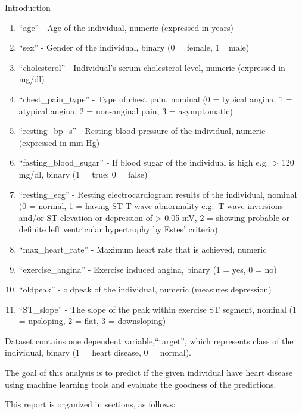 \documentclass[
  ignorenonframetext,
]{beamer}
\begin{document}
\begin{frame}{Introduction}
\begin{enumerate}
\item
  ``age'' - Age of the individual, numeric (expressed in years)
\item
  ``sex'' - Gender of the individual, binary (0 = female, 1= male)
\item
  ``cholesterol'' - Individual's serum cholesterol level, numeric
  (expressed in mg/dl)
\item
  ``chest\_pain\_type'' - Type of chest pain, nominal (0 = typical
  angina, 1 = atypical angina, 2 = non-anginal pain, 3 = asymptomatic)
\item
  ``resting\_bp\_s'' - Resting blood pressure of the individual, numeric
  (expressed in mm Hg)
\item
  ``fasting\_blood\_sugar'' - If blood sugar of the individual is high
  e.g.~\textgreater{} 120 mg/dl, binary (1 = true; 0 = false)
\item
  ``resting\_ecg'' - Resting electrocardiogram results of the
  individual, nominal (0 = normal, 1 = having ST-T wave abnormality
  e.g.~T wave inversions and/or ST elevation or depression of
  \textgreater{} 0.05 mV, 2 = showing probable or definite left
  ventricular hypertrophy by Estes' criteria)
\item
  ``max\_heart\_rate'' - Maximum heart rate that is achieved, numeric
\item
  ``exercise\_angina'' - Exercise induced angina, binary (1 = yes, 0 =
  no)
\item
  ``oldpeak'' - oldpeak of the individual, numeric (measures depression)
\item
  ``ST\_slope'' - The slope of the peak within exercise ST segment,
  nominal (1 = upsloping, 2 = flat, 3 = downsloping)
\end{enumerate}

Dataset contains one dependent variable,``target'', which represents
class of the individual, binary (1 = heart disease, 0 = normal).

The goal of this analysis is to predict if the given individual have
heart disease using machine learning tools and evaluate the goodness of
the predictions.

This report is organized in sections, as follows:


\end{frame}
\end{document}
